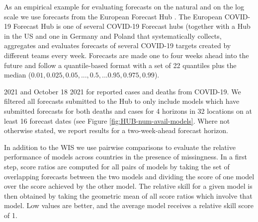 \documentclass{article}
\begin{document}
As an empirical example for evaluating forecasts on the natural and on the log scale we use forecasts from the European Forecast Hub \citep{europeancovid-19forecasthubEuropeanCovid19Forecast2021, sherrattPredictivePerformanceMultimodel2022}. 
The European COVID-19 Forecast Hub is one of several COVID-19 Forecast hubs (together with a Hub in the US \citep{cramerEvaluationIndividualEnsemble2021} and one in Germany and Poland \citep{bracherShorttermForecastingCOVID192021} that systematically collects, aggregates and evaluates forecasts of several COVID-19 targets created by different teams every week. Forecasts are made one to four weeks ahead into the future and follow a quantile-based format with a set of 22 quantiles plus the median ($0.01, 0.025, 0.05, ..., 0.5, ... 0.95, 0.975, 0.99$). 

 2021 and October 18 2021 for reported cases and deaths from COVID-19. We filtered all forecasts submitted to the Hub to only include models which have submitted forecasts for both deaths and cases for 4 horizons in 32 locations on at least 16 forecast dates (see Figure \ref{fig:HUB-num-avail-models}. Where not otherwise stated, we report results for a two-week-ahead forecast horizon. 

In addition to the WIS we use pairwise comparisons \citep{cramerEvaluationIndividualEnsemble2021} to evaluate the relative performance of models across countries in the presence of missingness. In a first step, score ratios are computed for all pairs of models by taking the set of overlapping forecasts between the two models and dividing the score of one model over the score achieved by the other model. The relative skill for a given model is then obtained by taking the geometric mean of all score ratios which involve that model. Low values are better, and the average model receives a relative skill score of 1. 

% 
\end{document}

